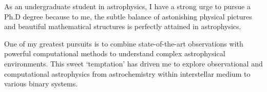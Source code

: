 \documentclass[12pt, a4paper]{awesome-cv} %
\begin{document}
\makecvheader %



\begin{cvletter}


As an undergraduate student in astrophysics, I have a strong urge to pursue a Ph.D degree  because to me, the subtle balance of astonishing physical pictures and beautiful mathematical structures is perfectly attained in astrophysics.

One of my greatest pursuits is to combine state-of-the-art observations with powerful computational methods to understand complex astrophysical environments. This sweet `temptation' has driven me to explore observational and computational astrophysics from astrochemistry within interstellar medium to various binary systems.




\end{cvletter}
\end{document}
